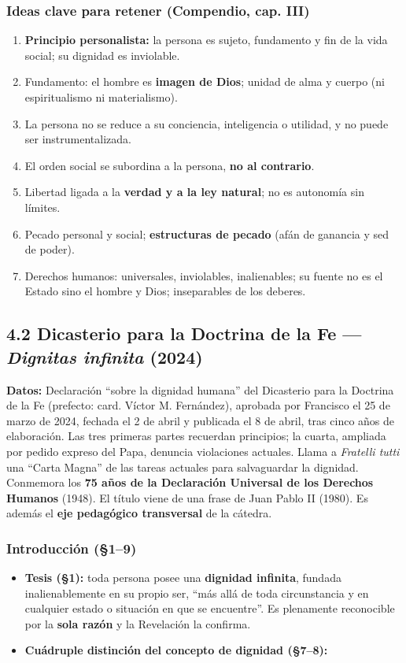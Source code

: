\documentclass[10pt,a4paper]{article}
\begin{document}
\subsubsection{Ideas clave para retener (Compendio, cap. III)}
\begin{enumerate}
\item \textbf{Principio personalista:} la persona es sujeto, fundamento y fin de la vida social; su dignidad es inviolable.
\item Fundamento: el hombre es \textbf{imagen de Dios}; unidad de alma y cuerpo (ni espiritualismo ni materialismo).
\item La persona no se reduce a su conciencia, inteligencia o utilidad, y no puede ser instrumentalizada.
\item El orden social se subordina a la persona, \textbf{no al contrario}.
\item Libertad ligada a la \textbf{verdad y a la ley natural}; no es autonomía sin límites.
\item Pecado personal y social; \textbf{estructuras de pecado} (afán de ganancia y sed de poder).
\item Derechos humanos: universales, inviolables, inalienables; su fuente no es el Estado sino el hombre y Dios; inseparables de los deberes.
\end{enumerate}



\subsection{4.2 Dicasterio para la Doctrina de la Fe --- \textit{Dignitas infinita} (2024)}

\noindent \textbf{Datos:} Declaración ``sobre la dignidad humana'' del Dicasterio para la Doctrina de la Fe (prefecto: card. Víctor M. Fernández), aprobada por Francisco el 25 de marzo de 2024, fechada el 2 de abril y publicada el 8 de abril, tras cinco años de elaboración. Las tres primeras partes recuerdan principios; la cuarta, ampliada por pedido expreso del Papa, denuncia violaciones actuales. Llama a \textit{Fratelli tutti} una ``Carta Magna'' de las tareas actuales para salvaguardar la dignidad. Conmemora los \textbf{75 años de la Declaración Universal de los Derechos Humanos} (1948). El título viene de una frase de Juan Pablo II (1980). Es además el \textbf{eje pedagógico transversal} de la cátedra.\par\smallskip

\subsubsection{Introducción (\S{}1--9)}
\begin{itemize}
\item \textbf{Tesis (\S{}1):} toda persona posee una \textbf{dignidad infinita}, fundada inalienablemente en su propio ser, ``más allá de toda circunstancia y en cualquier estado o situación en que se encuentre''. Es plenamente reconocible por la \textbf{sola razón} y la Revelación la confirma.
\item \textbf{Cuádruple distinción del concepto de dignidad (\S{}7--8):}
\end{itemize}
\end{document}
